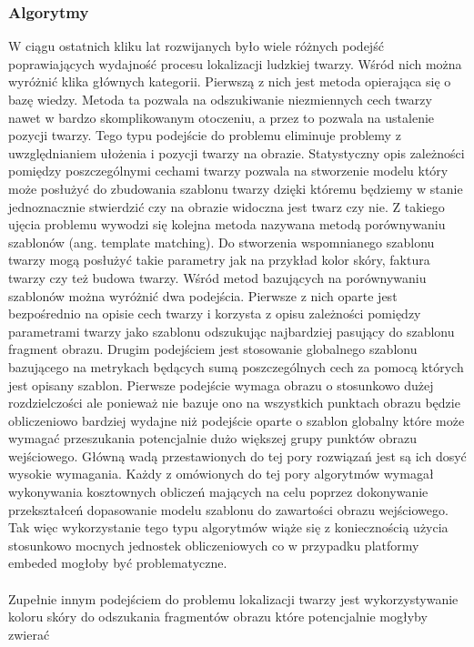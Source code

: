 \subsubsection{Algorytmy}
W ciągu ostatnich kliku lat rozwijanych było wiele różnych podejść poprawiających
wydajność procesu lokalizacji ludzkiej twarzy. Wśród nich można wyróżnić klika
głównych kategorii. Pierwszą z nich jest metoda opierająca się o bazę wiedzy.
Metoda ta pozwala na odszukiwanie niezmiennych cech twarzy nawet w bardzo
skomplikowanym otoczeniu, a przez to pozwala na ustalenie pozycji twarzy. Tego
typu podejście do problemu eliminuje problemy z uwzględnianiem ułożenia i pozycji
twarzy na obrazie. Statystyczny opis zależności pomiędzy poszczególnymi cechami
twarzy pozwala na stworzenie modelu który może posłużyć do zbudowania szablonu
twarzy dzięki któremu będziemy w stanie jednoznacznie stwierdzić czy na obrazie
widoczna jest twarz czy nie. Z takiego ujęcia problemu wywodzi się kolejna metoda
nazywana metodą porównywaniu szablonów (ang. template matching). Do stworzenia
wspomnianego szablonu twarzy mogą posłużyć takie parametry jak na przykład kolor
skóry, faktura twarzy czy też budowa twarzy. Wśród metod bazujących na
porównywaniu szablonów można wyróżnić dwa podejścia. Pierwsze z nich oparte jest
bezpośrednio na opisie cech twarzy i korzysta z opisu zależności pomiędzy
parametrami twarzy jako szablonu odszukując najbardziej pasujący do szablonu
fragment obrazu. Drugim podejściem jest stosowanie globalnego szablonu bazującego
na metrykach będących sumą poszczególnych cech za pomocą których jest opisany
szablon. Pierwsze podejście wymaga obrazu o stosunkowo dużej rozdzielczości ale
ponieważ nie bazuje ono na wszystkich punktach obrazu będzie obliczeniowo
bardziej wydajne niż podejście oparte o szablon globalny które może wymagać
przeszukania potencjalnie dużo większej grupy punktów obrazu wejściowego. Główną
wadą przestawionych do tej pory rozwiązań jest są ich dosyć wysokie wymagania.
Każdy z omówionych do tej pory algorytmów wymagał wykonywania kosztownych
obliczeń mających na celu poprzez dokonywanie przekształceń dopasowanie modelu
szablonu do zawartości obrazu wejściowego. Tak więc wykorzystanie tego typu
algorytmów wiąże się z koniecznością użycia stosunkowo mocnych jednostek
obliczeniowych co w przypadku platformy embeded mogłoby być problematyczne.\\
\\
Zupełnie innym podejściem do problemu lokalizacji twarzy jest wykorzystywanie
koloru skóry do odszukania fragmentów obrazu które potencjalnie mogłyby zwierać
